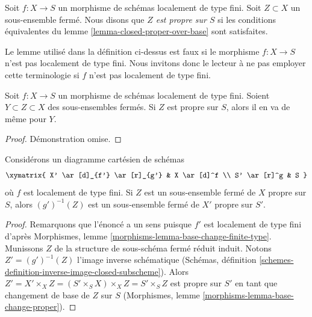 \begin{definition}
\label{definition-proper-over-base}
Soit $f : X \to S$ un morphisme de schémas localement de type fini.
Soit $Z \subset X$ un sous-ensemble fermé. Nous
disons que {\it $Z$ est propre sur $S$}
si les conditions équivalentes du lemme \ref{lemma-closed-proper-over-base}
sont satisfaites.
\end{definition}

\noindent
Le lemme utilisé dans la définition ci-dessus est faux si le morphisme
$f : X \to S$ n'est pas localement de type fini. Nous invitons donc le
lecteur à ne pas employer cette terminologie si $f$ n'est pas localement de
type fini.

\begin{lemma}
\label{lemma-closed-closed-proper-over-base}
Soit $f : X \to S$ un morphisme de schémas localement de type fini.
Soient $Y \subset Z \subset X$ des sous-ensembles fermés.
Si $Z$ est propre sur $S$, alors il en va de même pour $Y$.
\end{lemma}

\begin{proof}
Démonstration omise.
\end{proof}

\begin{lemma}
\label{lemma-base-change-closed-proper-over-base}
Considérons un diagramme cartésien de schémas
$$
\xymatrix{
X' \ar[d]_{f'} \ar[r]_{g'} & X \ar[d]^f \\
S' \ar[r]^g & S
}
$$
où $f$ est localement de type fini.
Si $Z$ est un sous-ensemble fermé de $X$ propre sur $S$, alors
$(g')^{-1}(Z)$ est un sous-ensemble fermé de $X'$ propre sur $S'$.
\end{lemma}

\begin{proof}
Remarquons que l'énoncé a un sens puisque $f'$ est localement de
type fini d'après Morphismes, lemme \ref{morphisms-lemma-base-change-finite-type}.
Munissons $Z$ de la structure de sous-schéma fermé réduit induit.
Notons $Z' = (g')^{-1}(Z)$ l'image inverse schématique (Schémas,
définition \ref{schemes-definition-inverse-image-closed-subscheme}).
Alors $Z' = X' \times_X Z = (S' \times_S X) \times_X Z = S' \times_S Z$
est propre sur $S'$ en tant que changement de base de $Z$ sur $S$
(Morphismes, lemme \ref{morphisms-lemma-base-change-proper}).
\end{proof}

